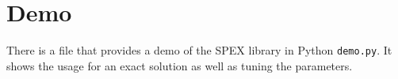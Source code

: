 \documentclass[12pt,oneside]{book}
\theoremstyle{definition}
\begin{document}
\section{Demo}
There is a file that provides a demo of the SPEX library in Python \verb|demo.py|. It shows the usage for an exact
solution as well as tuning the parameters.








\end{document}
